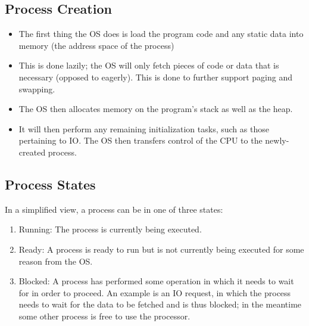 \documentclass[11pt, a4paper]{article}
\theoremstyle{definition}
\theoremstyle{remark}
\begin{document}
\subsection{Process Creation}
\begin{itemize}
  \item The first thing the OS does is load the program code and any static data into memory (the address space of the process)
  \item This is done lazily; the OS will only fetch pieces of code or data that is necessary (opposed to eagerly). This is done to further support paging and swapping. 
  \item The OS then allocates memory on the program's stack as well as the heap. 
  \item It will then perform any remaining initialization tasks, such as those pertaining to IO. The OS then transfers control of the CPU to the newly-created process. 
\end{itemize}
\subsection{Process States}
In a simplified view, a process can be in one of three states:
\begin{enumerate}
  \item Running: The process is currently being executed. 
  \item Ready: A process is ready to run but is not currently being executed for some reason from the OS. 
  \item Blocked: A process has performed some operation in which it needs to wait for in order to proceed. An example is an IO request, in which the process needs to wait for the data to be fetched and is thus blocked; in the meantime some other process is free to use the processor.
\end{enumerate}
\end{document}
